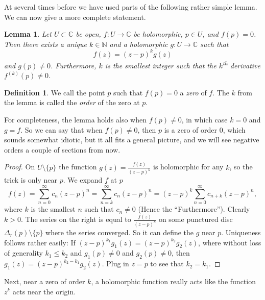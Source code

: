 \documentclass[12pt,openany]{book}
\newcommand{\C}{{\mathbb{C}}}
\newcommand{\N}{{\mathbb{N}}}
\newcommand{\myindex}[1]{#1\index{#1}}
\theoremstyle{plain}
\newtheorem{lemma}[thm]{Lemma}
\theoremstyle{remark}
\theoremstyle{definition}
\newtheorem{defn}[thm]{Definition}
\theoremstyle{exercise}
\theoremstyle{example}
\begin{document}
At several times before we have used parts of the following rather simple
lemma.  We can now give a more complete statement.  

\begin{lemma}
Let $U \subset \C$ be open, $f \colon U \to \C$ be holomorphic, $p \in U$,
and $f(p) = 0$.
Then there exists a unique $k \in \N$ and a holomorphic $g \colon U
\to \C$ such that
\begin{equation*}
f(z) = {(z-p)}^k g(z)
\end{equation*}
and $g(p) \not= 0$.
Furthermore, $k$ is the smallest integer such that the $k$\textsuperscript{th}
derivative $f^{(k)}(p) \not= 0$.
\end{lemma}

\begin{defn}
We call the point $p$ such that $f(p) = 0$ a \emph{\myindex{zero}} of
$f$.
The $k$ from the lemma is called the \emph{order}
of the zero at $p$.
\end{defn}

For completeness, the lemma holds also when $f(p) \not= 0$, in which case
$k=0$ and $g = f$.  So we can say that when $f(p) \not= 0$, then $p$ is
a zero of order 0, which sounds somewhat idiotic, but it all fits a general
picture, and we will see negative orders a couple of sections from now.

\begin{proof}
On $U \setminus \{ p \}$ the function $g(z) = \frac{f(z)}{{(z-p)}^k}$ is
holomorphic for any $k$, so the trick is only near $p$.  We expand $f$ at $p$
\begin{equation*}
f(z) =
\sum_{n=0}^\infty c_n {(z-p)}^n =
\sum_{n=k}^\infty c_n {(z-p)}^n 
= {(z-p)}^k
\sum_{n=0}^\infty c_{n+k} {(z-p)}^{n} ,
\end{equation*}
where $k$ is the smallest $n$ such that $c_n \not= 0$ (Hence the ``Furthermore'').
Clearly $k > 0$.
The series on the right is equal to $\frac{f(z)}{{(z-p)}^k}$ on
some punctured disc $\Delta_r(p)\setminus \{ p \}$ where the series
converged.
So it can define the $g$ near $p$.  Uniqueness follows rather easily:
If ${(z-p)}^{k_1} g_1(z) = {(z-p)}^{k_2} g_2(z)$, where without loss of generality
$k_1 \leq k_2$ and $g_1(p) \not= 0$ and $g_2(p) \not= 0$, then 
$g_1(z) = {(z-p)}^{k_2-k_1} g_2(z)$.  Plug in $z=p$ to see that $k_2 =
k_1$.
\end{proof}

Next, near a zero of order $k$, a holomorphic function really acts like the
function $z^k$ acts near the origin.
\end{document}
